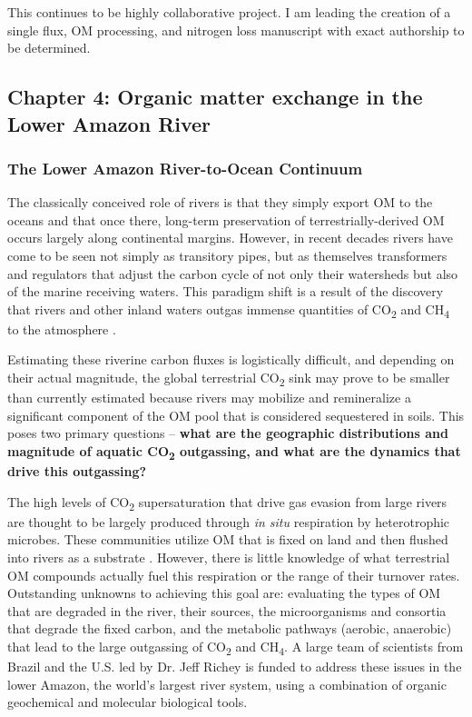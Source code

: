 \documentclass[12pt, letterpaper, twoside]{article}
\begin{document}
This continues to be highly collaborative project. I am leading the creation of a single flux, OM processing, and nitrogen loss manuscript with exact authorship to be determined. 

\subsection{Chapter 4: Organic matter exchange in the Lower Amazon River}

\subsubsection{The Lower Amazon River-to-Ocean Continuum}

The classically conceived role of rivers is that they simply export OM to the oceans and that once there, long-term preservation of terrestrially-derived OM occurs largely along continental margins. However, in recent decades rivers have come to be seen not simply as transitory pipes, but as themselves transformers and regulators that adjust the carbon cycle of not only their watersheds but also of the marine receiving waters. This paradigm shift is a result of the discovery that rivers and other inland waters outgas immense quantities of CO\textsubscript{2} and CH\textsubscript{4} to the atmosphere \cite{butman_significant_2011, richey_outgassing_2002}. 

Estimating these riverine carbon fluxes is logistically difficult, and depending on their actual magnitude, the global terrestrial CO\textsubscript{2} sink may prove to be smaller than currently estimated because rivers may mobilize and remineralize a significant component of the OM pool that is considered sequestered in soils. This poses two primary questions – \textbf{what are the geographic distributions and magnitude of aquatic CO\textsubscript{2} outgassing, and what are the dynamics that drive this outgassing?} 

The high levels of CO\textsubscript{2} supersaturation that drive gas evasion from large rivers are thought to be largely produced through \textit{in situ} respiration by heterotrophic microbes. These communities utilize OM that is fixed on land and then flushed into rivers as a substrate \cite{mayorga_young_2005, ward_degradation_2013, ward_reactivity_2016}. However, there is little knowledge of what terrestrial OM compounds actually fuel this respiration or the range of their turnover rates.  Outstanding unknowns to achieving this goal are: evaluating the types of OM that are degraded in the river, their sources, the microorganisms and consortia that degrade the fixed carbon, and the metabolic pathways (aerobic, anaerobic) that lead to the large outgassing of CO\textsubscript{2} and CH\textsubscript{4}. A large team of scientists from Brazil and the U.S. led by Dr. Jeff Richey is funded to address these issues in the lower Amazon, the world's largest river system, using a combination of organic geochemical and molecular biological tools.
\end{document}

